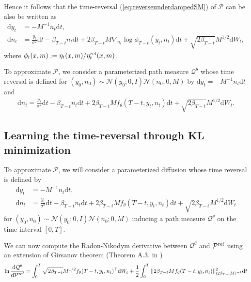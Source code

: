 \documentclass{article} %
\begin{document}
Hence it follows that the time-reversal (\ref{eq:reverseunderdampedSM}) of $\mathcal{P}$ can be also be written as
\begin{align}\label{eq:reverseunderdampedphiSM}
\mathrm{d}y_t&=-M^{-1}n_t\mathrm{d}t,\\
\mathrm{d}n_t&=
\frac{y_t}{\sigma^2}\mathrm{d}t - \beta_{T-t} n_t\mathrm{d}t +2\beta_{T-t}M \nabla_{n_t} \log \phi_{T-t}(y_t,n_t)\mathrm{d}t+\sqrt{2\beta_{T-t}}M^{1/2}\mathrm{d}W_t,  \nonumber
\end{align}
where $\phi_t(x,m):=\eta_t(x,m)/\eta_t^{\textup{ref}}(x,m)$. 

To approximate $\mathcal{P}$, we consider a parameterized path measure $\mathcal{Q}^\theta$ whose time reversal is defined for $(y_0,n_0)\sim \mathcal{N}(y_0;0,I)\mathcal{N}(n_0;0,M)$ by $\mathrm{d}y_t=-M^{-1}n_t\mathrm{d}t$ and 
\begin{align}\label{eq:reverseunderdampedQSM}
\mathrm{d}n_t
=\frac{y_t}{\sigma^2}\mathrm{d}t - \beta_{T-t} n_t\mathrm{d}t +2\beta_{T-t}M f_{\theta}(T-t,y_t,n_t)\mathrm{d}t+\sqrt{2\beta_{T-t}}M^{1/2}\mathrm{d}W_t.
\end{align}


\subsection{Learning the time-reversal through KL minimization \label{appdx:udmpcont}}
To approximate $\mathcal{P}$, we will consider a parameterized diffusion whose time reversal is defined by
\begin{align}\label{eq:reverseunderdampedQSM}
\mathrm{d}y_t&=-M^{-1}n_t\mathrm{d}t,\\
\mathrm{d}n_t&
=\frac{y_t}{\sigma^2}\mathrm{d}t - \beta_{T-t} n_t\mathrm{d}t +2\beta_{T-t}M f_{\theta}(T-t,y_t,n_t)\mathrm{d}t+\sqrt{2\beta_{T-t}}M^{1/2}\mathrm{d}W_t \nonumber
\end{align}
for $(y_0,n_0)\sim \mathcal{N}(y_0;0,I)\mathcal{N}(n_0;0,M)$
inducing a path measure $\mathcal{Q}^\theta$ on the time interval $[0,T]$.

We can now compute the Radon-Nikodym derivative between $\mathcal{Q}^\theta$ and $\mathcal{P}^{\textup{ref}}$ using an extension of Girsanov theorem  (Theorem A.3. in  \cite{sottinen2008application})
\begin{align}\nonumber
    \log \frac{\mathrm{d}\mathcal{Q}^{\theta}}{\mathrm{d}\mathcal{P}^{\textup{ref}}}&=\int^T_0 \sqrt{2\beta_{T-t}}M^{1/2} f_{\theta}(T-t,y_t,n_t)^\top \mathrm{d}W_t+\frac{1}{2}\int^T_0 ||2\beta_{T-t}M  f_{\theta}(T-t,y_t,n_t)||^2_{(2\beta_{T-t}M)^{-1}} \mathrm{d}t\\
\end{align}
\end{document}
